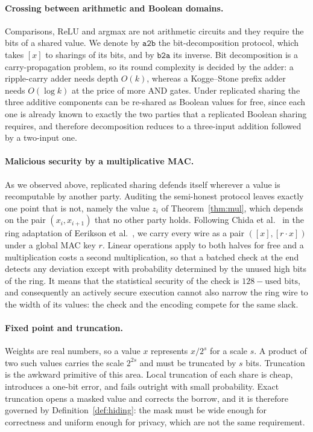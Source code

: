 \documentclass[11pt]{article}
\newcommand{\bt}[1]{\texttt{#1}}
\newcommand{\ReLU}{\ensuremath{\mathrm{ReLU}}}
\begin{document}
\paragraph{Crossing between arithmetic and Boolean domains.} Comparisons, $\ReLU$ and
argmax are not arithmetic circuits and they require the bits of a shared value. We denote by
$\bt{a2b}$ the bit-decomposition protocol, which takes $[x]$ to sharings of its bits, and by
$\bt{b2a}$ its inverse. Bit decomposition is a carry-propagation problem, so its round
complexity is decided by the adder: a ripple-carry adder needs depth $O(k)$, whereas a
Kogge--Stone prefix adder~\cite{KoggeStone} needs $O(\log k)$ at the price of more AND
gates. Under replicated sharing the three additive components can be re-shared as Boolean
values for free, since each one is already known to exactly the two parties that a
replicated Boolean sharing requires, and therefore decomposition reduces to a three-input
addition followed by a two-input one.

\paragraph{Malicious security by a multiplicative MAC.} As we observed above, replicated
sharing defends itself wherever a value is recomputable by another party. Auditing the
semi-honest protocol leaves exactly one point that is not, namely the value $z_i$ of
Theorem~\ref{thm:mul}, which depends on the pair $(x_i,x_{i+1})$ that no other party holds.
Following Chida et al.~\cite{Chida} in the ring adaptation of Eerikson et
al.~\cite{Eerikson}, we carry every wire as a pair $([x],[r\cdot x])$ under a global MAC key
$r$. Linear operations apply to both halves for free and a multiplication costs a second
multiplication, so that a batched check at the end detects any deviation except with
probability determined by the unused high bits of the ring. It means that the statistical
security of the check is $128 - \text{used bits}$, and consequently an actively secure
execution cannot also narrow the ring wire to the width of its values: the check and the
encoding compete for the same slack.

\paragraph{Fixed point and truncation.} Weights are real numbers, so a value $x$ represents
$x/2^{s}$ for a scale $s$. A product of two such values carries the scale $2^{2s}$ and must
be truncated by $s$ bits. Truncation is the awkward primitive of this area. Local truncation
of each share is cheap, introduces a one-bit error, and fails outright with small
probability. Exact truncation opens a masked value and corrects the borrow, and it is
therefore governed by Definition~\ref{def:hiding}: the mask must be wide enough for
correctness and uniform enough for privacy, which are not the same requirement.
\end{document}
